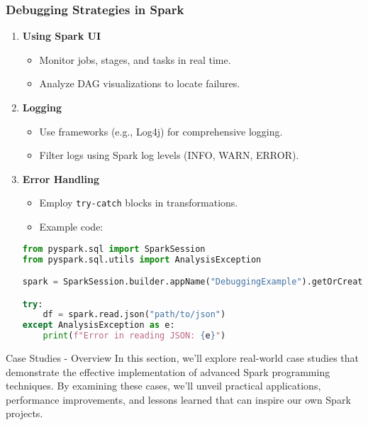 \documentclass[aspectratio=169]{beamer}
\begin{document}
\begin{frame}[fragile]
    \frametitle{Debugging Strategies in Spark}
    \begin{enumerate}
        \item \textbf{Using Spark UI}
            \begin{itemize}
                \item Monitor jobs, stages, and tasks in real time.
                \item Analyze DAG visualizations to locate failures.
            \end{itemize}
        \item \textbf{Logging}
            \begin{itemize}
                \item Use frameworks (e.g., Log4j) for comprehensive logging.
                \item Filter logs using Spark log levels (INFO, WARN, ERROR).
            \end{itemize}
        \item \textbf{Error Handling}
            \begin{itemize}
                \item Employ \texttt{try-catch} blocks in transformations.
                \item Example code:
                \end{itemize}
                \begin{lstlisting}[language=Python]
from pyspark.sql import SparkSession
from pyspark.sql.utils import AnalysisException

spark = SparkSession.builder.appName("DebuggingExample").getOrCreate()

try:
    df = spark.read.json("path/to/json")
except AnalysisException as e:
    print(f"Error in reading JSON: {e}")
                \end{lstlisting}
    \end{enumerate}
\end{frame}

\begin{frame}{Case Studies - Overview}
  In this section, we'll explore real-world case studies that demonstrate the effective implementation of advanced Spark programming techniques. 
  By examining these cases, we’ll unveil practical applications, performance improvements, and lessons learned that can inspire our own Spark projects.
\end{frame}
\end{document}
